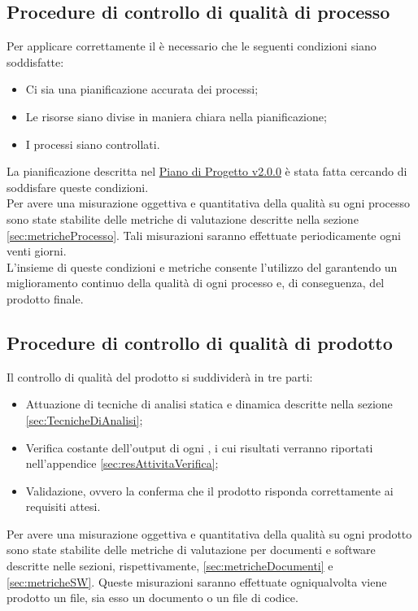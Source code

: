 \documentclass{scalatekids-article}
\begin{document}
\subsection{Procedure di controllo di qualità di processo}
Per applicare correttamente il  è necessario che le seguenti condizioni siano soddisfatte:
\begin{itemize}
\item{Ci sia una pianificazione accurata dei processi;}
\item{Le risorse siano divise in maniera chiara nella pianificazione;}
\item{I processi siano controllati.}
\end{itemize}
La pianificazione descritta nel \href{run:./PianoDiProgetto\_v2.0.0.pdf}{Piano di Progetto v2.0.0} è stata fatta cercando di soddisfare queste condizioni.\\
Per avere una misurazione oggettiva e quantitativa della qualità su ogni processo sono state stabilite delle metriche di valutazione descritte nella sezione \ref{sec:metricheProcesso}. Tali misurazioni saranno effettuate periodicamente ogni venti giorni.\\
L'insieme di queste condizioni e metriche consente l'utilizzo del  garantendo un miglioramento continuo della qualità di ogni processo e, di conseguenza, del prodotto finale.
\subsection{Procedure di controllo di qualità di prodotto}
Il controllo di qualità del prodotto si suddividerà in tre parti:
\begin{itemize}
\item{Attuazione di tecniche di analisi statica e dinamica descritte nella sezione \ref{sec:TecnicheDiAnalisi};}
\item{Verifica costante dell'output di ogni , i cui risultati verranno riportati nell'appendice \ref{sec:resAttivitaVerifica};}
\item{Validazione, ovvero la conferma che il prodotto risponda correttamente ai requisiti attesi.}
\end{itemize}
Per avere una misurazione oggettiva e quantitativa della qualità su ogni prodotto sono state stabilite delle metriche di valutazione per documenti e software descritte nelle sezioni, rispettivamente, \ref{sec:metricheDocumenti} e \ref{sec:metricheSW}. Queste misurazioni saranno effettuate ogniqualvolta viene prodotto un file, sia esso un documento o un file di codice.\\
\end{document}
